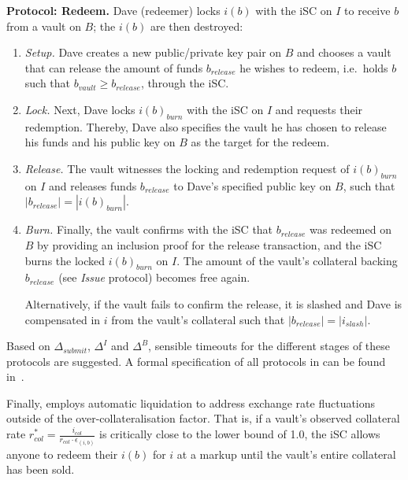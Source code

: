 \textbf{Protocol: Redeem.} Dave (redeemer) locks $i(b)$ with the \textsf{iSC} on $I$ to receive $b$ from a vault on $B$; the $i(b)$ are then destroyed:
\begin{enumerate}
    \item \emph{Setup.}
    Dave creates a new public/private key pair on $B$ and chooses a vault that can release the amount of funds $b_{release}$ he wishes to redeem, i.e.\ holds $b$ such that $b_{vault} \geq b_{release}$, through the \textsf{iSC}.
    
    \item \emph{Lock.}
    Next, Dave locks $i(b)_{burn}$ with the \textsf{iSC} on $I$ and requests their redemption.
    Thereby, Dave also specifies the vault he has chosen to release his funds and his public key on $B$ as the target for the redeem.
    
    \item \emph{Release.}
    The vault witnesses the locking and redemption request of $i(b)_{burn}$ on $I$ and releases funds $b_{release}$ to Dave’s specified public key on $B$, such that $|b_{release}| = |i(b)_{burn}|$.
    
    \item \emph{Burn.}
    Finally, the vault confirms with the \textsf{iSC} that $b_{release}$ was redeemed on $B$ by providing an inclusion proof for the release transaction, and the \textsf{iSC} burns the locked $i(b)_{burn}$ on $I$.
    The amount of the vault's collateral backing $b_{release}$ (see \emph{Issue} protocol) becomes free again.
    
    Alternatively, if the vault fails to confirm the release, it is slashed and Dave is compensated in $i$ from the vault's collateral such that $|b_{release}| = |i_{slash}|$.
\end{enumerate}

Based on $\Delta_{submit}$, $\Delta^I$ and $\Delta^B$, sensible timeouts for the different stages of these protocols are suggested.
A formal specification of all protocols in \xclaim can be found in~\cite[Section VI-A]{zamyatin2019xclaim}.

Finally, \xclaim employs automatic liquidation to address exchange rate fluctuations outside of the over-collateralisation factor.
That is, if a vault's observed collateral rate $r_{col}^* = \frac{i_{col}}{r_{col} \cdot \epsilon_{(i,b)}}$ is critically close to the lower bound of 1.0, the \textsf{iSC} allows anyone to redeem their $i(b)$ for $i$ at a markup until the vault's entire collateral has been sold.

